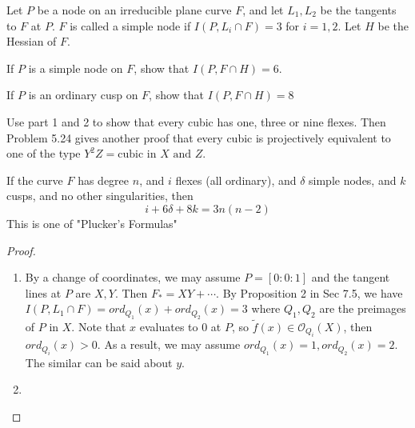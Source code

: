 \documentclass{solution}
\begin{document}
\begin{problem}{7.22}
    Let $P$ be a node on an irreducible plane curve $F$, and let $L_1, L_2$ be the tangents to $F$ at $P$. $F$ is called a simple node if $I(P, L_i \cap F) = 3$ for $i = 1, 2$. Let $H$ be the Hessian of $F$. \begin{inparaenum}
        \item If $P$ is a simple node on $F$, show that $I(P, F \cap H) = 6$. 
        \item If $P$ is an ordinary cusp on $F$, show that $I(P, F \cap H) = 8$
        \item Use part 1 and 2 to show that every cubic has one, three or nine flexes. Then Problem 5.24 gives another proof that every cubic is projectively equivalent to one of the type $Y^2Z = \text{cubic in $X$ and $Z$}$.
        \item If the curve $F$ has degree $n$, and $i$ flexes (all ordinary), and $\delta$ simple nodes, and $k$ cusps, and no other singularities, then
        $$i + 6 \delta + 8k = 3n(n - 2)$$
        This is one of "Plucker's Formulas"
    \end{inparaenum}
\end{problem}

\begin{proof}
    \TODO
    \begin{enumerate}
        \item By a change of coordinates, we may assume $P = [0:0:1]$ and the tangent lines at $P$ are $X, Y$. Then $F_* = XY + \cdots$. By Proposition 2 in Sec 7.5, we have $I(P, L_1 \cap F) = ord_{Q_1}(x) + ord_{Q_2}(x) = 3$ where $Q_1, Q_2$ are the preimages of $P$ in $X$. Note that $x$ evaluates to $0$ at $P$, so $\tilde{f}(x) \in \mathcal{O}_{Q_i}(X)$, then $ord_{Q_i}(x) \gt 0$. As a result, we may assume $ord_{Q_1}(x) = 1, ord_{Q_2}(x) = 2$. The similar can be said about $y$. \TODO
        \item 
    \end{enumerate}
\end{proof}
\end{document}
